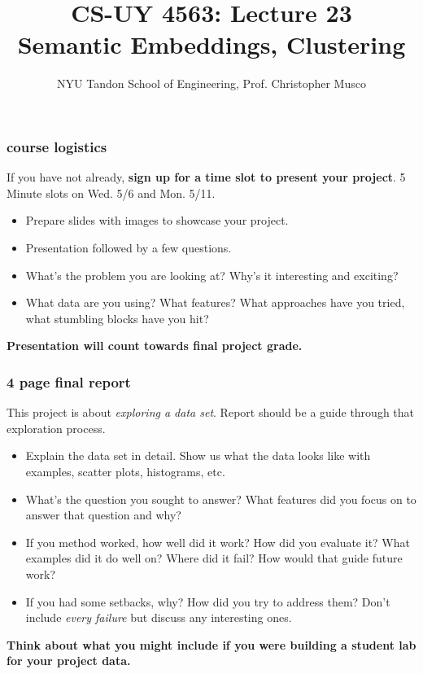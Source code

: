 \documentclass[handout,compress]{beamer}
\title{CS-UY 4563: Lecture 23 \\ Semantic Embeddings, Clustering}
\author{NYU Tandon School of Engineering, Prof. Christopher Musco}
\date{}
\begin{document}
	
	\begin{frame}
		\titlepage 
	\end{frame}
	
	\metroset{titleformat=smallcaps}
	


\begin{frame}
	\frametitle{course logistics}
	If you have not already, \textbf{sign up for a time slot to present your project}. 5 Minute slots on Wed. 5/6 and Mon. 5/11.
	\begin{itemize}
		\item Prepare slides with images to showcase your project. 
		\item Presentation followed by a few questions. 
		\item  What's the problem you are looking at? Why's it interesting and exciting? 
		\item  What data are you using? What features? What approaches have you tried, what stumbling blocks have you hit?
	\end{itemize}

\begin{center}
\textbf{\alert{Presentation will count towards final project grade.}}
\end{center}
\end{frame}

\begin{frame}
	\frametitle{4 page final report}
	\small
	This project is about \emph{exploring a data set}. Report should be a guide through that exploration process. 
	\begin{itemize}
		\item Explain the data set in detail. Show us what the data looks like with examples, scatter plots, histograms, etc. 
		\item What's the question you sought to answer? What features did you focus on to answer that question and why?
		\item If you method worked, how well did it work? How did you evaluate it? What examples did it do well on? Where did it fail? How would that guide future work?
		\item If you had some setbacks, why? How did you try to address them? Don't include \emph{every failure} but discuss any interesting ones.
	\end{itemize}
\begin{center}
	\textbf{\alert{Think about what you might include if you were building a student lab for your project data.}}
\end{center}
\end{frame}
\end{document}
